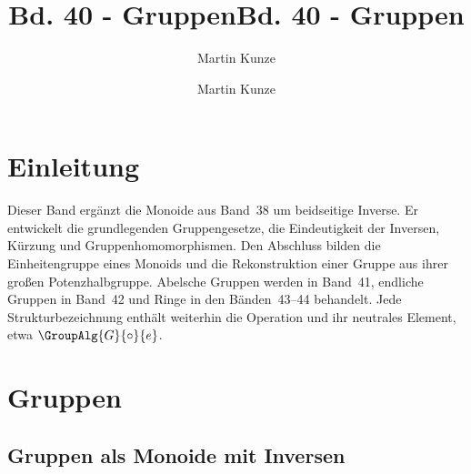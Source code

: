 \documentclass[main.tex]{subfiles}
\title{Bd. 40 - Gruppen}
\author{Martin Kunze}
\date{}
\begin{document}

\providecommand{\BandXXIXProofRefStack}[1]{%
  \ensuremath{\begin{gathered}[t]#1\end{gathered}}}
\title{Bd. 40 - Gruppen}
\author{Martin Kunze}
\date{}
\hypersetup{pageanchor=false}
\maketitle
\hypersetup{pageanchor=true}
\setcounter{tocdepth}{3}
\tableofcontents
\setcounter{file}{40}
\renewcommand{\FormulaBandID}{40}

\chapter{Einleitung}

Dieser Band ergänzt die Monoide aus Band~38 um beidseitige Inverse.
Er entwickelt die grundlegenden Gruppengesetze, die Eindeutigkeit der
Inversen, Kürzung und Gruppenhomomorphismen. Den Abschluss bilden die
Einheitengruppe eines Monoids und die Rekonstruktion einer Gruppe aus ihrer
großen Potenzhalbgruppe. Abelsche Gruppen werden in Band~41, endliche
Gruppen in Band~42 und Ringe in den Bänden~43--44 behandelt.
Jede Strukturbezeichnung enthält weiterhin die Operation und ihr
neutrales Element, etwa \(\GroupAlg{G}{\circ}{e}\).

\chapter{Gruppen}

\section{Gruppen als Monoide mit Inversen}


\end{document}
